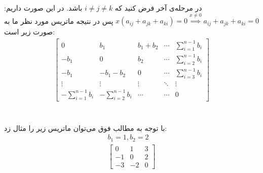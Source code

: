 \noindent
در مرحله‌ی آخر فرض کنید که
$i \neq j \neq k$
باشد. در این صورت داریم:
$x (a_{ij} + a_{jk} + a_{ki}) = 0 \stackrel{x \neq 0}{\implies} a_{ij} + a_{jk} + a_{ki} = 0$
پس در نتیجه ماتریس مورد نظر ما به صورت زیر است:
\begin{gather*}
    \begin{bmatrix}
        0 & b_1 & b_1 + b_2 & \cdots & \sum_{i=1}^{n-1} b_i \\
        -b_1 & 0 & b_2 & \cdots & \sum_{i=2}^{n-1} b_i\\
        -b_1 & -b_1 - b_2 & 0 & \cdots & \sum_{i=3}^{n-1} b_i\\
        \vdots & \vdots & \vdots & \ddots & \vdots\\
        -\sum_{i=1}^{n-1} b_i & -\sum_{i=2}^{n-1} b_i & \cdots & \cdots & 0
    \end{bmatrix}
\end{gather*}
\\\\
با توجه به مطالب فوق می‌توان ماتریس زیر را مثال زد:
\begin{gather*}
    b_1 = 1, b_2 = 2\\
    \begin{bmatrix}
        0 & 1 & 3\\
        -1 & 0 & 2\\
        -3 & -2 & 0
    \end{bmatrix}
\end{gather*}